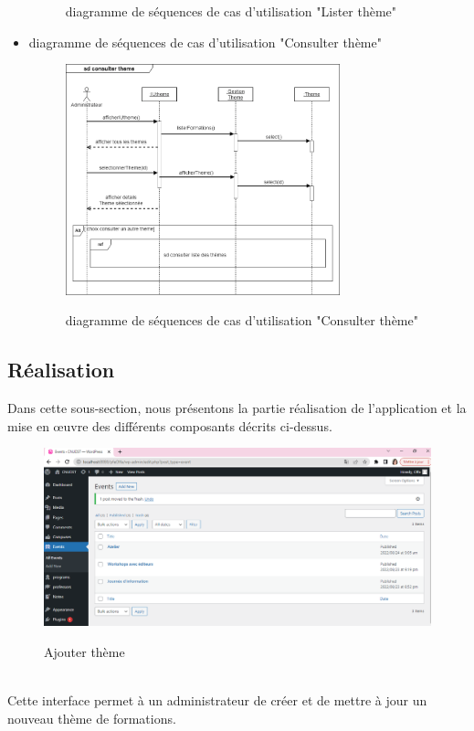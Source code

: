 \begin{itemize}
\begin{figure}[!h]
	\caption{diagramme de séquences de cas d'utilisation "Lister thème"}
	\label{Org}
\end{figure}
\newpage
\item diagramme de séquences de cas d'utilisation "Consulter thème"
\begin{figure}[!h]
	\centering
	{\includegraphics[width=0.75\textwidth]{D) IMAGES/diagconstheme.png}}
	\caption{diagramme de séquences de cas d'utilisation "Consulter thème"}
	\label{Org}
\end{figure}

\newpage
\end{itemize}
\subsection{Réalisation}
Dans cette sous-section, nous présentons la partie réalisation de l’application et la mise en œuvre des
différents composants décrits ci-dessus.
\begin{figure}[!h]
	\centering
	{\includegraphics[width=1\textwidth]{D) IMAGES/ajouterTheme.png}}
	\caption{Ajouter thème}
	\label{Diagramme3}
\end{figure}\\
Cette interface permet à un administrateur de créer et de mettre à jour un nouveau thème de formations.

